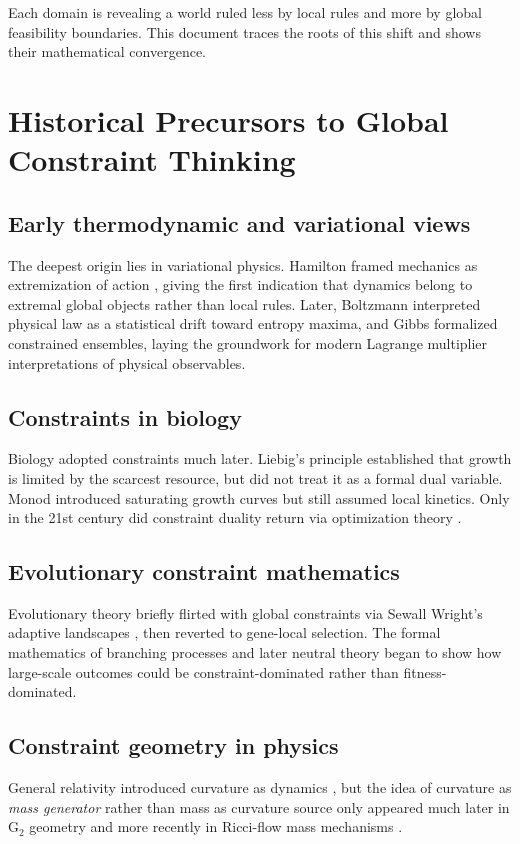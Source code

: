 \documentclass[11pt,a4paper]{article}
\begin{document}
Each domain is revealing a world ruled less by local rules and more by global feasibility boundaries. This document traces the roots of this shift and shows their mathematical convergence.

\section{Historical Precursors to Global Constraint Thinking}

\subsection{Early thermodynamic and variational views}
The deepest origin lies in variational physics. Hamilton framed mechanics as extremization of action \citep{Hamilton1834}, giving the first indication that dynamics belong to extremal global objects rather than local rules. Later, Boltzmann \citep{Boltzmann1877} interpreted physical law as a statistical drift toward entropy maxima, and Gibbs \citep{Gibbs1902} formalized constrained ensembles, laying the groundwork for modern Lagrange multiplier interpretations of physical observables.

\subsection{Constraints in biology}
Biology adopted constraints much later. Liebig’s principle \citep{Liebig1840} established that growth is limited by the scarcest resource, but did not treat it as a formal dual variable. Monod \citep{Monod1949} introduced saturating growth curves but still assumed local kinetics. Only in the 21st century did constraint duality return via optimization theory \citep{Yamagishi2025}.

\subsection{Evolutionary constraint mathematics}
Evolutionary theory briefly flirted with global constraints via Sewall Wright’s adaptive landscapes \citep{Wright1931}, then reverted to gene-local selection. The formal mathematics of branching processes \citep{Kolmogorov1938} and later neutral theory \citep{Kimura1968} began to show how large-scale outcomes could be constraint-dominated rather than fitness-dominated.

\subsection{Constraint geometry in physics}
General relativity introduced curvature as dynamics \citep{Einstein1915}, but the idea of curvature as \textit{mass generator} rather than mass as curvature source only appeared much later in G$_2$ geometry \citep{Joyce2000, Bryant2006} and more recently in Ricci-flow mass mechanisms \citep{Pincak2025}.
\end{document}
